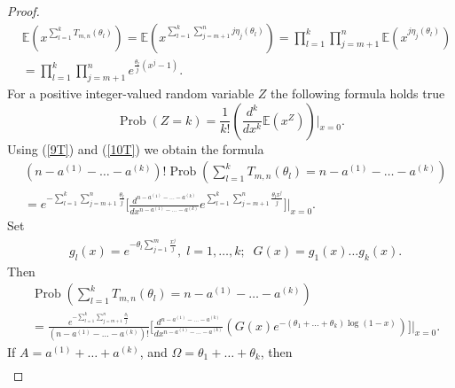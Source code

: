 \documentclass[12pt]{amsart}
\theoremstyle{definition}
\numberwithin{equation}{section}
\DeclareMathOperator{\Prob}{Prob}
\begin{document}
\begin{proof}
\begin{equation}
\begin{split}
&\mathbb{E}\left(x^{\sum\limits_{l=1}^kT_{m,n}(\theta_l)}\right)
=\mathbb{E}\left(x^{\sum\limits_{l=1}^k
\sum\limits_{j=m+1}^nj\eta_j(\theta_l)}\right)
=\prod\limits_{l=1}^k\prod\limits_{j=m+1}^n
\mathbb{E}\left(x^{j\eta_j(\theta_l)}\right)\\
&=\prod\limits_{l=1}^k\prod\limits_{j=m+1}^n
e^{\frac{\theta_l}{j}(x^j-1)}.
\end{split}
\end{equation}
For a positive integer-valued random variable $Z$ the following formula holds true
\begin{equation}\label{10T}
\Prob\left(Z=k\right)=\frac{1}{k!}\left(\frac{d^k}{dx^k}\mathbb{E}\left(x^Z\right)\right)\biggl\vert_{x=0}.
\end{equation}
Using (\ref{9T}) and (\ref{10T}) we obtain the formula
\begin{equation}\label{11.1T}
\begin{split}
&(n-a^{(1)}-\ldots-a^{(k)})!
\Prob\left(\sum\limits_{l=1}^kT_{m,n}(\theta_l)=n-a^{(1)}-\ldots-a^{(k)}\right)\\
&=e^{-\sum\limits_{l=1}^k\sum\limits_{j=m+1}^n\frac{\theta_l}{j}}\biggl[\frac{d^{n-a^{(1)}-\ldots-a^{(k)}}}{dx^{n-a^{(1)}-\ldots-a^{(k)}}}
e^{\sum\limits_{l=1}^k\sum\limits_{j=m+1}^n\frac{\theta_lx^j}{j}}\biggr]\biggr\vert_{x=0}.
\end{split}
\end{equation}
Set
\begin{equation}
\begin{split}
&g_l(x)=e^{-\theta_l\sum\limits_{j=1}^{m}
\frac{x^j}{j}},\; l=1,\ldots,k;\;\; G(x)=g_1(x)\ldots g_k(x).
\end{split}
\end{equation}
Then
\begin{equation}\label{12.1T}
\begin{split}
&
\Prob\left(\sum\limits_{l=1}^kT_{m,n}(\theta_l)=n-a^{(1)}-\ldots-a^{(k)}\right)\\
&=\frac{e^{-\sum\limits_{l=1}^k\sum\limits_{j=m+1}^n\frac{\theta_l}{j}}}{(n-a^{(1)}-\ldots-a^{(k)})!}
\biggl[\frac{d^{n-a^{(1)}-\ldots-a^{(k)}}}{dx^{n-a^{(1)}-\ldots-a^{(k)}}}
\left(G(x)e^{-\left(\theta_1+\ldots+\theta_k\right)\log(1-x)}\right)
\biggr]\biggr\vert_{x=0}.
\end{split}
\end{equation}
If $A=a^{(1)}+\ldots+a^{(k)}$, and $\Omega=\theta_1+\ldots+\theta_k$, then
\begin{equation}
\begin{split}

\end{split}
\end{equation}
\end{proof}
\end{document}
